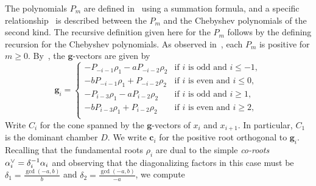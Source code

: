 \documentclass[ALCO,ThmDefs,Unicode,epreuves]{cedram}
\newcommand{\ck}{\spcheck}
\newcommand{\g}{\mathbf{g}}
\newcommand{\cc}{\mathbf{c}}
\begin{document}
The polynomials $P_m$ are defined in~\cite[Section~9]{universal} using a summation formula, and a specific relationship~\cite[(9.10)]{universal} is described between the $P_m$ and the Chebyshev polynomials of the second kind.
The recursive definition given here for the $P_m$ follows by the defining recursion for the Chebyshev polynomials.
As observed in~\cite[Section~9]{universal}, each $P_m$ is positive for $m\ge0$.
By~\cite[Proposition~9.6]{universal}, the $\g$-vectors are given by
\begin{equation}\label{ba gs}
\g_i=\begin{cases}
-P_{-i-1}\rho_1-aP_{-i-2}\rho_2&\text{if }i\text{ is odd and }i\le-1,\\
-bP_{-i-1}\rho_1+P_{-i-2}\rho_2&\text{if }i\text{ is even and }i\le0,\\
-P_{i-3}\rho_1-aP_{i-2}\rho_2&\text{if }i\text{ is odd and }i\ge1,\\
-bP_{i-3}\rho_1+P_{i-2}\rho_2&\text{if }i\text{ is even and }i\ge2,\\
\end{cases}
\end{equation}
Write $C_i$ for the cone spanned by the $\g$-vectors of $x_i$ and $x_{i+1}$.
In particular, $C_1$ is the dominant chamber $D$.
We write $\cc_i$ for the positive root orthogonal to $\g_i$. 
Recalling that the fundamental roots $\rho_i$ are dual to the simple \emph{co-roots} $\alpha_i\ck=\delta_i^{-1}\alpha_i$ and observing that the diagonalizing factors in this case must be 
$\delta_1=\frac{\gcd(-a,b)}{b}$ and $\delta_2=\frac{\gcd(-a,b)}{-a}$, we compute
\end{document}
